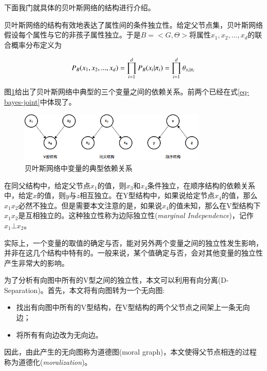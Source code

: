 下面我门就具体的贝叶斯网络的结构进行介绍。

贝叶斯网络的结构有效地表达了属性间的条件独立性。给定父节点集，贝叶斯网络假设每个属性与它的非孩子属性独立。于是$B = <G,\Theta>$将属性$x_1,x_2,...,x_d$的联合概率分布定义为

\begin{equation}
P_B(x_1,x_2,...,x_d) = \prod_{i=1}^{d} P_B(x_i | \pi_i) = \prod_{i=1}^{d}\theta_{x_i|\pi_i}\\
\label{eq-bayes-joint}
\end{equation}

图\ref{fig-bayes-dependence}给出了贝叶斯网络中典型的三个变量之间的依赖关系。前两个已经在式\ref{eq-bayes-joint}中体现了。




\begin{figure}[ht]
    \centering
    \includegraphics[scale=1, width=0.8\textwidth]{figure/BNrelation.png}
    \caption{贝叶斯网络中变量的典型依赖关系}
    \label{fig-bayes-dependence}
\end{figure}


在同父结构中，给定父节点$x_1$的值，则$x_3$和$x_4$条件独立，在顺序结构的依赖关系中，给定$x$的值，则$y$与$z$相互独立。在Y型结构中，如果说给定节点$x_4$的值，那么$x_1$$x_2$必然不独立。但是需要本文注意的是，如果说$x_4$的值未知，那么在V型结构下$x_1$$x_2$是互相独立的。这种独立性称为边际独立性(\textit{marginal Independence})，记作$x_1 \bot x_2$。

实际上，一个变量的取值的确定与否，能对另外两个变量之间的独立性发生影响，并非在这几个结构中特有的。一般来说，某个值确定与否，会对其他变量的独立性产生非常大的影响。

为了分析有向图中所有的V型之间的独立性，本文可以利用有向分离(D-Separation)。首先，本文将有向图转为一个无向图:

\begin{itemize}
	\item 找出有向图中所有的V型结构，在V型结构的两个父节点之间架上一条无向边；
	\item 将所有有向边改为无向边。
\end{itemize}

因此，由此产生的无向图称为道德图(moral graph)，本文使得父节点相连的过程称为道德化(\textit{moralization})。

